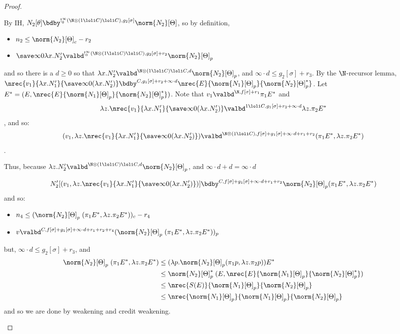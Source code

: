 \begin{proof}
\begin{itemize}
By IH, $N_2[\theta] \bdby^{!^\infty_0(\N \otimes (1 \loli C) \loli C),g_2[\sigma]}\norm{N_2}[\Theta]$, so by definition,
\begin{itemize}
  \item $n_2 \leq \norm{N_2}[\Theta]_c - r_2$
  \item $\save \infty 0 {\lambda x.N_2'} \valbd^{!^\infty_0(\N\otimes (1 \loli C) \loli C),g_2[\sigma] + r_2}\norm{N_2}[\Theta]_p$
\end{itemize}
and so there is a $d \geq 0$ so that $\lambda x.N_2' \valbd^{\N \otimes (1 \loli C) \loli C,d} \norm{N_2}[\Theta]_p$, and $\infty \cdot d \leq g_2[\sigma] + r_3$. By the $\N$-recursor lemma, $\nrec {v_1} {\lambda x.N_1'} {\save \infty 0 {(\lambda x.N_2')}} \bdby^{C,g_1[\sigma] + r_2 + \infty \cdot d} \nrec {E} {\norm{N_1}[\Theta]_p} {\norm{N_2}[\Theta]_p^*}$.
Let $E^* = (E,\nrec {E} {\norm{N_1}[\Theta]_p} {\norm{N_2}[\Theta]_p^*})$. Note that $v_1 \valbd^{\N,f[\sigma] + r_1} \pi_1 E^*$ and $$\lambda z. \nrec {v_1} {\lambda x.N_1'} {\save \infty 0 {(\lambda x.N_2')}} \valbd^{1 \loli C,g_1[\sigma] + r_2 + \infty \cdot d} \lambda z. \pi_2 E^*$$, and so:
$$
(v_1,\lambda z. \nrec {v_1} {\lambda x.N_1'} {\save \infty 0 {(\lambda x.N_2')}}) \valbd^{\N \otimes (1 \loli C),f[\sigma] + g_1[\sigma] + \infty \cdot d + r_1 + r_2} (\pi_1  E^*,\lambda z.\pi_2 E^*)
$$.

Thus, because $\lambda z.N_2' \valbd^{\N \otimes (1 \loli C) \loli C,d} \norm{N_2}[\Theta]_p$, and $\infty \cdot d + d = \infty \cdot d$

$$
N_2'[(v_1,\lambda z. \nrec {v_1} {\lambda x.N_1'} {\save \infty 0 {(\lambda x.N_2')}})] \bdby^{C,f[\sigma] + g_1[\sigma] + \infty \cdot d + r_1 + r_2} \norm{N_2}[\Theta]_p(\pi_1  E^*,\lambda z.\pi_2 E^*)
$$
and so:
\begin{itemize}
  \item $n_4 \leq (\norm{N_2}[\Theta]_p \; (\pi_1  E^*,\lambda z.\pi_2 E^*))_c - r_4$
  \item $v \valbd^{C,f[\sigma] + g_1[\sigma] + \infty \cdot d + r_1 + r_2 + r_4}  (\norm{N_2}[\Theta]_p \; (\pi_1  E^*,\lambda z.\pi_2 E^*))_p$
\end{itemize}
but, $\infty \cdot d \leq g_2[\sigma] + r_3$, and
\begin{align*}
  \norm{N_2}[\Theta]_p \; (\pi_1  E^*,\lambda z.\pi_2 E^*) &\leq (\lambda p. \norm{N_2}[\Theta]_p (\pi_1 p,\lambda z.\pi_2 p))E^*\\
  &\leq \norm{N_2}[\Theta]_p^* \; (E,\nrec {E} {\norm{N_1}[\Theta]_p} {\norm{N_2}[\Theta]_p^*})\\
  &\leq \nrec {S(E)} {\norm{N_1}[\Theta]_p} {\norm{N_2}[\Theta]_p}\\
  &\leq \nrec {\norm{N_1}[\Theta]_p} {\norm{N_1}[\Theta]_p} {\norm{N_2}[\Theta]_p}
\end{align*}
and so we are done by weakening and credit weakening.



\end{itemize}
\end{proof}
